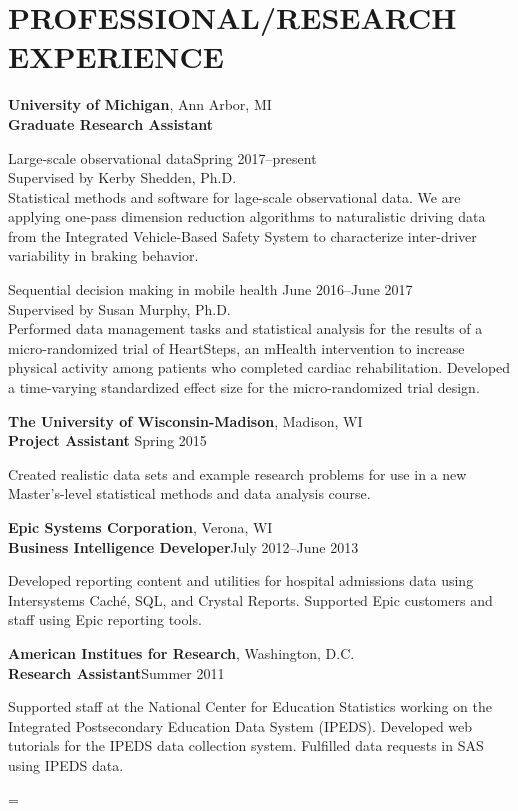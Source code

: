 \documentclass[letterpaper, 11pt]{article}
\newenvironment{absolutelynopagebreak}
  {\par\nobreak\vfil\penalty0\vfilneg
   \vtop\bgroup}
  {\par\xdef\tpd{\the\prevdepth}\egroup
   \prevdepth=\tpd}
\begin{document}
\section{PROFESSIONAL/RESEARCH EXPERIENCE}

{\bf University of Michigan}, Ann Arbor, MI\\
{\bf Graduate Research Assistant}

{\addtolength{\leftskip}{15pt}Large-scale observational data\hfill Spring 2017--present\\
Supervised by Kerby Shedden, Ph.D.\\
Statistical methods and software for lage-scale observational data. We are applying one-pass dimension reduction algorithms to naturalistic driving data from the Integrated Vehicle-Based Safety System to characterize inter-driver variability in braking behavior.

}

{\addtolength{\leftskip}{15pt} Sequential decision making in mobile health \hfill June 2016--June 2017\\
Supervised by Susan Murphy, Ph.D.\\
Performed data management tasks and statistical analysis for the results of a micro-randomized trial of HeartSteps, an mHealth intervention to increase  physical activity among patients who completed cardiac rehabilitation. Developed a time-varying standardized effect size for the micro-randomized trial design. 

}

{\bf The University of Wisconsin-Madison}, Madison, WI\\
{\bf Project Assistant} \hfill Spring 2015

{\addtolength{\leftskip}{15pt}
 Created realistic data sets and example research problems for use in a new Master's-level
  statistical methods and data analysis course.

}

{\bf Epic Systems Corporation}, Verona, WI\\
{\bf Business Intelligence Developer}\hfill July 2012--June 2013

{\addtolength{\leftskip}{15pt}
 Developed reporting content and utilities for hospital
  admissions data using Intersystems
  Cach\'{e}, SQL, and Crystal Reports.
 Supported Epic customers and
  staff using Epic reporting tools.

}

\begin{absolutelynopagebreak}
{\bf American Institues for Research}, Washington, D.C.\\
{\bf Research Assistant}\hfill Summer 2011

{\addtolength{\leftskip}{15pt}
    Supported staff at the National Center for Education Statistics
   working on the Integrated Postsecondary Education Data System
   (IPEDS).
 Developed web tutorials for the IPEDS data collection
   system.
 Fulfilled data requests in SAS using IPEDS data.


}

\end{absolutelynopagebreak}
\end{document}
